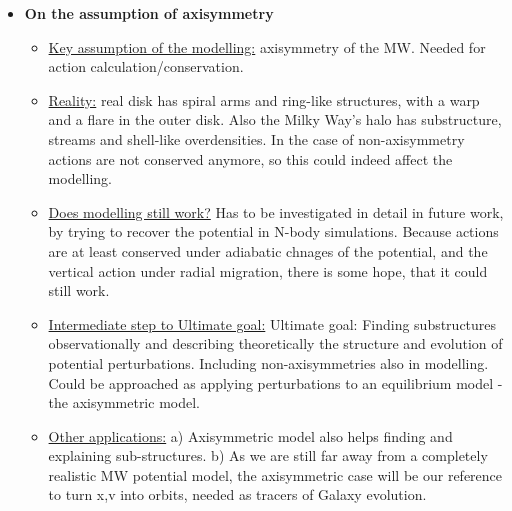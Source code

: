 \begin{itemize}
\item \textbf{On the assumption of axisymmetry} 
\begin{itemize}
\item \underline{Key assumption of the modelling:} axisymmetry of the MW. Needed for action calculation/conservation.
\item \underline{Reality:}  real disk has spiral arms and ring-like structures, with a warp and a flare in the outer disk. Also the Milky Way's halo has substructure, streams and shell-like overdensities. In the case of non-axisymmetry actions are not conserved anymore, so this could indeed affect the modelling.
\item \underline{Does modelling still work?} Has to be investigated in detail in future work, by trying to recover the potential in N-body simulations. Because actions are at least conserved under adiabatic chnages of the potential, and the vertical action under radial migration, there is some hope, that it could still work.
\item \underline{Intermediate step to Ultimate goal:} Ultimate goal: Finding substructures observationally and describing theoretically the structure and evolution of potential perturbations. Including non-axisymmetries also in modelling. Could be approached as applying perturbations to an equilibrium model - the axisymmetric model. 
\item \underline{Other applications:} a) Axisymmetric model also helps finding and explaining sub-structures.  b) As we are still far away from a completely realistic MW potential model, the axisymmetric case will be our reference to turn x,v into orbits, needed as tracers of Galaxy evolution.
\end{itemize}


\end{itemize}

